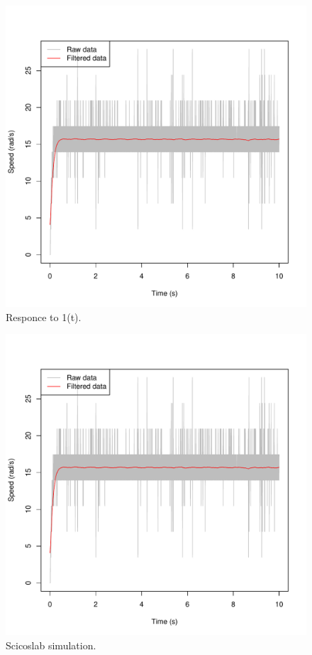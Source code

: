 \documentclass[a4paper,12pt,oneside]{article}
\begin{document}
\begin{figure}[t]
	\centering
	\includegraphics[width=\columnwidth]{../motor_data/plots/filtering/90}
	\caption{Responce to 1(t).}
	\label{fig:responce}
\end{figure}

\begin{figure}[t]
	\centering
	\includegraphics[width=\columnwidth]{../motor_data/plots/filtering/90}
	\caption{Scicoslab simulation.}
	\label{fig:simulation}
\end{figure}
\end{document}

